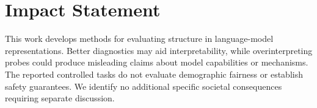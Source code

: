 \documentclass{article}
\begin{document}
\section*{Impact Statement}
This work develops methods for evaluating structure in language-model representations. Better diagnostics may aid interpretability, while overinterpreting probes could produce misleading claims about model capabilities or mechanisms. The reported controlled tasks do not evaluate demographic fairness or establish safety guarantees. We identify no additional specific societal consequences requiring separate discussion.



\appendix
\onecolumn








\end{document}
